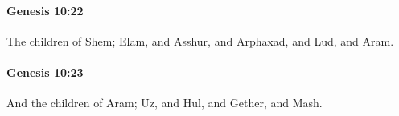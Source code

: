 		\paragraph{Genesis 10:22} %
			\label{GENESIS-10-22}

			The children of Shem; Elam, and Asshur, and Arphaxad, and Lud, and Aram.


		\paragraph{Genesis 10:23} %
			\label{GENESIS-10-23}

			And the children of Aram; Uz, and Hul, and Gether, and Mash.


